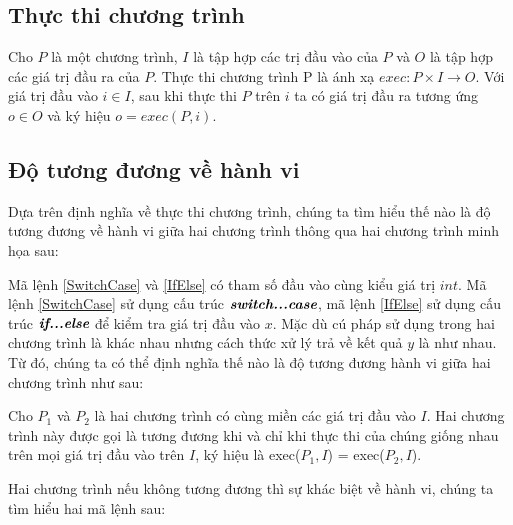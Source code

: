 \subsection{Thực thi chương trình}
\begin{definition}\label{def:progexe}
Cho $P$ là một chương trình, $I$ là tập hợp các trị đầu vào của $P$ và $O$ là tập hợp các giá trị đầu ra của $P$. Thực thi chương trình P là ánh xạ $exec: P \times I \rightarrow O$. Với giá trị đầu vào $i \in I$, sau khi thực thi $P$ trên $i$ ta có giá trị đầu ra tương ứng $o \in O$ và ký hiệu $o = exec(P, i)$.  
\end{definition}

\subsection{Độ tương đương về hành vi}
Dựa trên định nghĩa về thực thi chương trình, chúng ta tìm hiểu thế nào là độ tương đương về hành vi giữa hai chương trình thông qua hai chương trình minh họa sau:

{\scriptsize \begin{minipage}[t]{0.45\linewidth}
	
\end{minipage}
\hfill\vrule\hfill
\begin{minipage}[t]{0.45\linewidth}
	
\end{minipage}}


Mã lệnh \ref{SwitchCase} và \ref{IfElse} có tham số đầu vào cùng kiểu giá trị $int$. Mã lệnh \ref{SwitchCase} sử dụng cấu trúc $\textit{\textbf{switch...case}}$, mã lệnh \ref{IfElse} sử dụng cấu trúc $\textit{\textbf{if...else}}$ để kiểm tra giá trị đầu vào $x$. Mặc dù cú pháp sử dụng trong hai chương trình là khác nhau nhưng cách thức xử lý trả về kết quả $y$ là như nhau. Từ đó, chúng ta có thể định nghĩa thế nào là độ tương đương hành vi giữa hai chương trình như sau:

\begin{definition}
 Cho $P_{1}$ và $P_{2}$ là hai chương trình có cùng miền các giá trị đầu vào $I$. Hai chương trình này được gọi là tương đương khi và chỉ khi thực thi của chúng giống nhau trên mọi giá trị đầu vào trên $I$, ký hiệu là exec($P_{1}, I$) = exec($P_{2}, I$). 
\end{definition}	

Hai chương trình nếu không tương đương thì sự khác biệt về hành vi, chúng ta tìm hiểu hai mã lệnh sau:

